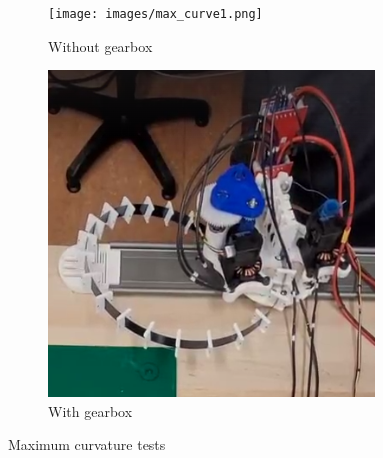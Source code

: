 \begin{figure}[H]
     \centering
     \begin{subfigure}[b]{0.48\textwidth}
         \centering
         \texttt{[image: images/max\_curve1.png]}
         \caption{Without gearbox}
         \label{fig:maximum_curve1}
     \end{subfigure}
     \hfill
     \begin{subfigure}[b]{0.48\textwidth}
         \centering
         \includegraphics[width=\textwidth]{images/max_curve2.png}
         \caption{With gearbox}
         \label{fig:maximum_curve2}
     \end{subfigure}
        \caption{Maximum curvature tests}
        \label{fig:maximum_curve}
\end{figure}


